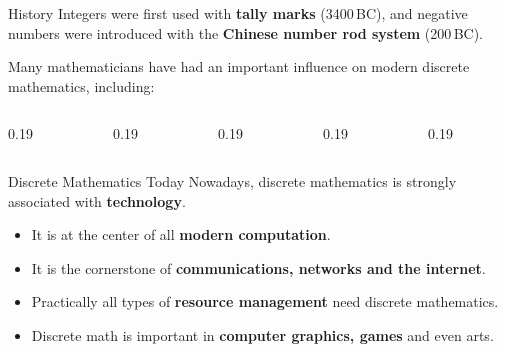 \documentclass[aspectratio=169,11pt]{beamer}
\begin{document}
\begin{frame}{History}
  Integers were first used with \textbf{tally marks} (3400\,BC),
  and negative numbers were introduced with the
  \textbf{Chinese number rod system} (200\,BC).

  \medskip
  Many mathematicians have had an important influence on modern
  discrete mathematics, including:

  \bigskip
  \begin{columns}[c]
    \begin{column}{0.19\textwidth}
    \end{column}
    \begin{column}{0.19\textwidth}
    \end{column}
    \begin{column}{0.19\textwidth}
    \end{column}
    \begin{column}{0.19\textwidth}
    \end{column}
    \begin{column}{0.19\textwidth}
    \end{column}
  \end{columns}
\end{frame}

\begin{frame}{Discrete Mathematics Today}
  Nowadays, discrete mathematics is strongly associated with
  \textbf{technology}.

  \bigskip
  \begin{itemize}
    \setlength\itemsep{0.5em}
    \item It is at the center of all \textbf{modern computation}.
    \item It is the cornerstone of
          \textbf{communications, networks and the internet}.
    \item Practically all types of \textbf{resource management}
          need discrete mathematics.
    \item Discrete math is important in
          \textbf{computer graphics, games} and even arts.
  \end{itemize}
\end{frame}
\end{document}
